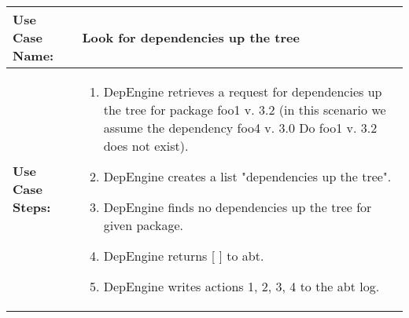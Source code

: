 \newpage
\begin{tabularx}{\linewidth}{|l|X|}
\hline
\textbf{Use Case Name:} & \textbf{Look for dependencies up the tree} \\
\hline
\textbf{Use Case Steps:} & 
\begin{minipage}{\linewidth} 
 \vspace{0.05em}
  \begin{enumerate}
   \item DepEngine retrieves a request for dependencies up the tree for package foo1 v. 3.2 (in this scenario we assume the dependency foo4 v. 3.0 Do foo1 v. 3.2 does not exist).
   \item DepEngine creates a list "dependencies up the tree".
   \item DepEngine finds no dependencies up the tree for given package.   
   \item DepEngine returns [ ] to abt.
   \item DepEngine writes actions 1, 2, 3, 4 to the abt log.
  \end{enumerate}
 \vspace{0.05em}
\end{minipage}
\\
\hline 
\end{tabularx}

